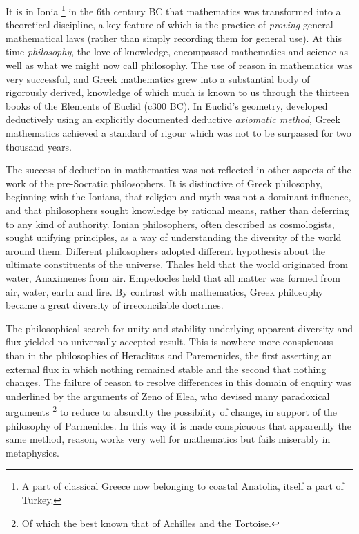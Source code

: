 It is in Ionia%
\footnote{A part of classical Greece now belonging to coastal Anatolia,
  itself a part of Turkey.}
 in the 6th century BC that mathematics was transformed into a
 theoretical discipline, a key feature of which is the practice of
 \emph{proving} general mathematical laws (rather than simply
 recording them for general use).
At this time \emph{philosophy}, the love of knowledge, encompassed
mathematics and science as well as what we might now call philosophy.
The use of reason in mathematics was very successful, and Greek
mathematics grew into a substantial body of rigorously derived,
knowledge of which much is known to us through the thirteen books of
the Elements of Euclid (c300 BC). 
In Euclid's geometry, developed deductively using an explicitly
documented deductive \emph{axiomatic method},
Greek mathematics achieved a standard of rigour which was not to be
surpassed for two thousand years.

The success of deduction in mathematics was not reflected in other
aspects of the work of the pre-Socratic philosophers.
It is distinctive of Greek philosophy, beginning with the Ionians,
that religion and myth was not a dominant influence, and that
philosophers sought knowledge by rational means, rather than deferring
to any kind of authority.
Ionian philosophers, often described as cosmologists, sought unifying
principles, as a way of understanding the diversity of the world
around them. 
Different philosophers adopted different hypothesis about the ultimate
constituents of the universe.
Thales held that the world originated from water, Anaximenes from air.
Empedocles held that all matter was formed from air, water, earth and
fire.
By contrast with mathematics, Greek philosophy became a great
diversity of irreconcilable doctrines.

The philosophical search for unity and stability underlying apparent
diversity and flux yielded no universally accepted result.
This is nowhere more conspicuous than in the philosophies of
Heraclitus and Paremenides, the
first asserting an external flux in which nothing remained stable and
the second that nothing changes. 
The failure of reason to resolve differences in this domain of enquiry
was underlined by the arguments of Zeno of Elea,
who devised many paradoxical arguments%
\footnote{Of which the best known that of Achilles and the Tortoise.}
to reduce to absurdity the possibility of change, in support of the
philosophy of Parmenides.
In this way it is made conspicuous that apparently the same method,
reason, works very well for mathematics but fails miserably in
metaphysics.

